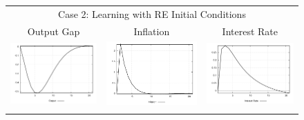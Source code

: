 \begin{figure}
\begin{tabular}{ccc}
\multicolumn{3}{c}{Case 2: Learning with RE Initial Conditions}\\
Output Gap & Inflation & Interest Rate \\ 
\includegraphics[scale=0.28]{results_reallinit/Output_costshock_irf.png} & 
\includegraphics[scale=0.28]{results_reallinit/Inflation_costshock_irf.png} & 
\includegraphics[scale=0.28]{results_reallinit/Interest_Rate_costshock_irf.png} \\ \\ 

\end{tabular}
\end{figure}
